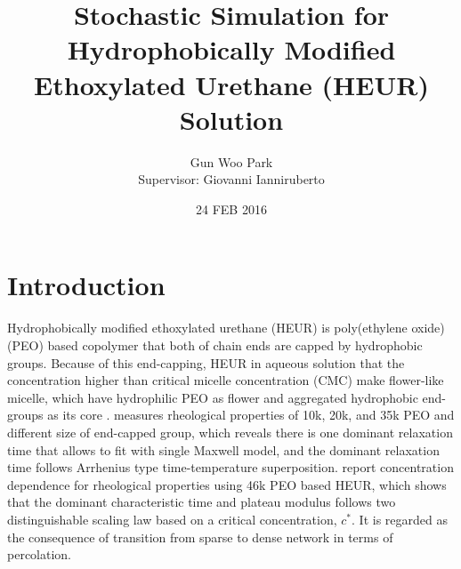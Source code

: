 \documentclass[10pt, a4paper]{article}
\title{Stochastic Simulation for Hydrophobically Modified Ethoxylated Urethane (HEUR) Solution}
\author{Gun Woo Park\\ Supervisor: Giovanni Ianniruberto}
\affil{\textit{Dipartimento di Ingegneria Chimica, dei Materiali e della Produzione Industriale, Università degli Studi di Napoli Federico II}}
\date{24 FEB 2016}
\begin{document}
\maketitle
\section{Introduction}
Hydrophobically modified ethoxylated urethane (HEUR) is poly(ethylene oxide) (PEO) based copolymer that both of chain ends are capped by hydrophobic groups. Because of this end-capping, HEUR in aqueous solution that the concentration higher than critical micelle concentration (CMC) make flower-like micelle, which have hydrophilic PEO as flower and aggregated hydrophobic end-groups as its core \parencite{Xu:1996ke}. \textcite{Annable:1993jd} measures rheological properties of 10k, 20k, and 35k PEO and different size of end-capped group, which reveals there is one dominant relaxation time that allows to fit with single Maxwell model, and the dominant relaxation time follows Arrhenius type time-temperature superposition. \textcite{Uneyama:2012ge} report concentration dependence for rheological properties using 46k PEO based HEUR, which shows that the dominant characteristic time and plateau modulus follows two distinguishable scaling law based on a critical concentration, $c^\ast$. It is regarded as the consequence of transition from sparse to dense network in terms of percolation.

\end{document}
